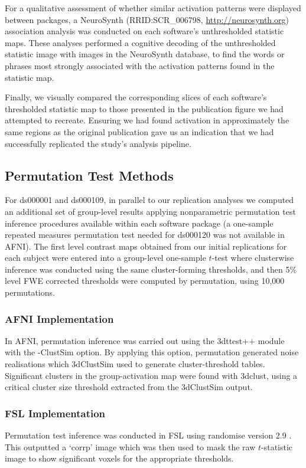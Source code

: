 For a qualitative assessment of whether similar activation patterns were displayed between packages, a NeuroSynth (RRID:SCR\_006798, \href{http://neurosynth.org}{http://neurosynth.org}) association analysis was conducted on each software's unthresholded statistic maps.  These analyses performed a cognitive decoding of the unthresholded statistic image with images in the NeuroSynth database, to find the words or phrases most strongly associated with the activation patterns found in the statistic map. 

Finally, we visually compared the corresponding slices of each software's thresholded statistic map to those presented in the publication figure we had attempted to recreate. Ensuring we had found activation in approximately the same regions as the original publication gave us an indication that we had successfully replicated the study's analysis pipeline.

\subsection{Permutation Test Methods}

For ds000001 and ds000109, in parallel to our replication analyses we computed an additional set of group-level results applying nonparametric permutation test inference procedures available within each software package (a one-sample repeated measures permutation test needed for ds000120 was not available in AFNI). The first level contrast maps obtained from our initial replications for each subject were entered into a group-level one-sample $t$-test where clusterwise inference was conducted using the same cluster-forming thresholds, and then 5\% level FWE corrected thresholds were computed by permutation, using 10,000 permutations.

\subsubsection{AFNI Implementation}
In AFNI, permutation inference was carried out using the 3dttest++ module with the -ClustSim option. By applying this option, permutation generated noise realisations which 3dClustSim used to generate cluster-threshold tables. Significant clusters in the group-activation map were found with 3dclust, using a critical cluster size threshold extracted from the 3dClustSim output. 

\subsubsection{FSL Implementation}
Permutation test inference was conducted in FSL using randomise version 2.9 \citep{Winkler2016-mw}. This outputted a `corrp' image which was then used to mask the raw $t$-statistic image to show significant voxels for the appropriate thresholds. 


